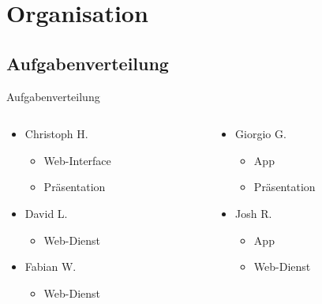 \documentclass[19pt]{beamer}
\begin{document}
\section{Organisation}

\subsection{Aufgabenverteilung}
\begin{frame}{Aufgabenverteilung}
  \begin{columns}[T]
    \begin{column}{.5\textwidth}
    		\begin{itemize}
    	\item Christoph H.
			\begin{itemize}
				\item Web-Interface
				\item Präsentation
			\end{itemize}
		\item David L.
			\begin{itemize}
				\item Web-Dienst
			\end{itemize}
		\item Fabian W.
			\begin{itemize}
				\item Web-Dienst
			\end{itemize}
    		\end{itemize}
    \end{column}
    \begin{column}{.5\textwidth}
    \begin{itemize}
		\item Giorgio G.
			\begin{itemize}
				\item App
				\item Präsentation
			\end{itemize}
		\item Josh R.
			\begin{itemize}
				\item App
				\item Web-Dienst
			\end{itemize}
	\end{itemize}
    \end{column}
  \end{columns}
\end{frame}
\end{document}
